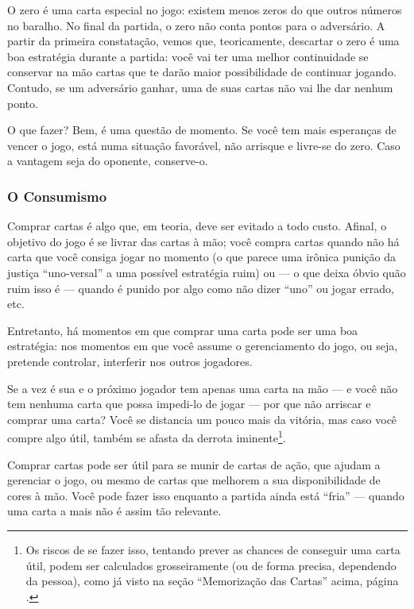 O zero é uma carta especial no jogo: existem menos zeros do que outros números no baralho. No final da partida, o zero não conta pontos para o adversário. A partir da primeira constatação, vemos que, teoricamente, descartar o zero é uma boa estratégia durante a partida: você vai ter uma melhor continuidade se conservar na mão cartas que te darão maior possibilidade de continuar jogando. Contudo, se um adversário ganhar, uma de suas cartas não vai lhe dar nenhum ponto.

O que fazer? Bem, é uma questão de momento. Se você tem mais esperanças de vencer o jogo, está numa situação favorável, não arrisque e livre-se do zero. Caso a vantagem seja do oponente, conserve-o.

\subsubsection{O Consumismo}

\label{consumismo}

Comprar cartas é algo que, em teoria, deve ser evitado a todo custo. Afinal, o objetivo do jogo é se livrar das cartas à mão; você compra cartas quando não há carta que você consiga jogar no momento (o que parece uma irônica punição da justiça ``uno-versal'' a uma possível estratégia ruim) ou --- o que deixa óbvio quão ruim isso é --- quando é punido por algo como não dizer ``uno'' ou jogar errado, etc.

Entretanto, há momentos em que comprar uma carta pode ser uma boa estratégia: nos momentos em que você assume o gerenciamento do jogo, ou seja, pretende controlar, interferir nos outros jogadores.

Se a vez é sua e o próximo jogador tem apenas uma carta na mão --- e você não tem nenhuma carta que possa impedi-lo de jogar --- por que não arriscar e comprar uma carta? Você se distancia um pouco mais da vitória, mas caso você compre algo útil, também se afasta da derrota iminente\footnote{Os riscos de se fazer isso, tentando prever as chances de conseguir uma carta útil, podem ser calculados grosseiramente (ou de forma precisa, dependendo da pessoa), como já visto na seção ``Memorização das Cartas'' acima, página \pageref{memorizacaodascartas}.}.

Comprar cartas pode ser útil para se munir de cartas de ação, que ajudam a gerenciar o jogo, ou mesmo de cartas que melhorem a sua disponibilidade de cores à mão. Você pode fazer isso enquanto a partida ainda está ``fria'' --- quando uma carta a mais não é assim tão relevante.

